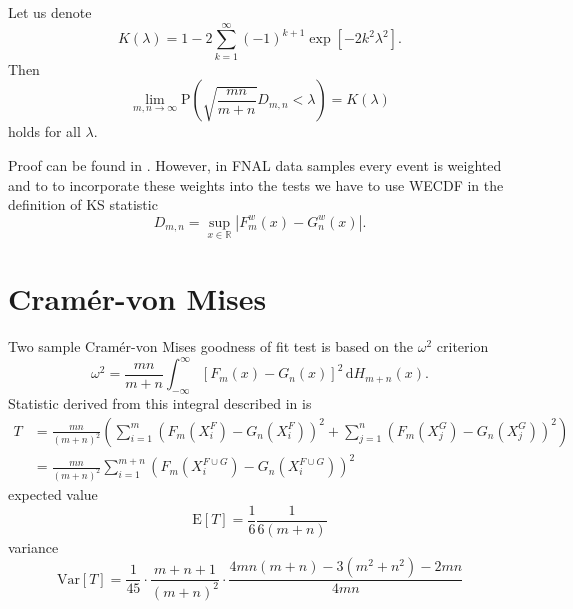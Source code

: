 \begin{theorem}[Smirnov]
	Let us denote  
	\begin{equation}
	K(\lambda) = 1 - 2\sum_{k=1}^{\infty} (-1)^{k+1} \exp\left[ -2k^2\lambda^2\right].
	\end{equation}
	Then 
	\begin{equation}
	\lim_{m,n \rightarrow \infty} \mathrm{P}(\sqrt{\frac{mn}{m+n}}D_{m,n} < \lambda) = K(\lambda)
	\end{equation}
	holds for all $\lambda$.
\end{theorem}
\noindent Proof can be found in \cite{Smirnov1944}. 
However, in FNAL data samples every event is weighted and to to incorporate these weights into the tests we have to use WECDF in the definition of KS statistic
\begin{equation}
D_{m,n} = \sup_{x \in \mathbb{R}} |F^w_m(x) - G^w_n(x)|.
\end{equation}

\section{Cram\'{e}r-von Mises}
Two sample Cram\'{e}r-von Mises goodness of fit test is based on the $\omega^2$ criterion
\begin{equation}
\omega^2 = \frac{mn}{m+n} \int_{-\infty}^\infty \left[F_m(x) - G_n(x) \right]^2 \,\mathrm{d} H_{m+n}(x).
\end{equation} 
Statistic derived from this integral described in \cite{Anderson62} is
\begin{align}
T & = \frac{mn}{(m+n)^2}\left( \sum_{i=1}^m \left( F_m(X^F_i) - G_n(X^F_i)\right)^2 + \sum_{j=1}^n \left( F_m(X^G_j) - G_n(X^G_j)\right)^2 \right) \\
& = \frac{mn}{(m+n)^2} \sum_{i=1}^{m+n} \left( F_m(X^{F\cup G}_i) - G_n(X^{F\cup G}_i)\right)^2  %
\end{align}
expected value
\begin{equation}
\mathrm{E} [T] = \frac{1}{6} \frac{1}{6(m+n)}
\end{equation}
variance 
\begin{equation}
\mathrm{Var} [T] = \frac{1}{45} \cdot \frac{m+n+1}{(m+n)^2} \cdot \frac{4mn(m+n) - 3(m^2 + n^2)-2mn}{4mn}
\end{equation}

